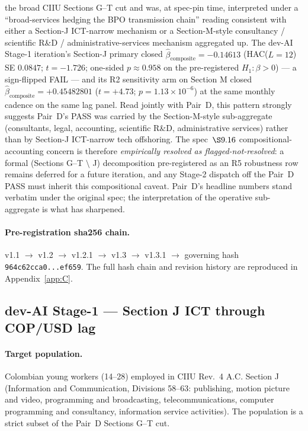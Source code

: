 \begin{enumerate}
    the broad CIIU Sections G--T cut and was, at spec-pin time,
    interpreted under a ``broad-services hedging the BPO transmission
    chain'' reading consistent with either a Section-J ICT-narrow
    mechanism or a Section-M-style consultancy / scientific R\&D /
    administrative-services mechanism aggregated up. The dev-AI
    Stage-1 iteration's Section-J primary closed
    \(\hat{\beta}_{\mathrm{composite}} = -0.14613\)
    (HAC(\(L=12\)) SE \(0.0847\); \(t = -1.726\); one-sided
    \(p \approx 0.958\) on the pre-registered \(H_1: \beta > 0\)) ---
    a sign-flipped FAIL --- and its R2 sensitivity arm on Section M
    closed \(\hat{\beta}_{\mathrm{composite}} = +0.45482801\)
    (\(t = +4.73\); \(p = 1.13 \times 10^{-6}\)) at the same monthly
    cadence on the same lag panel. Read jointly with Pair~D, this
    pattern strongly suggests Pair~D's PASS was carried by the
    Section-M-style sub-aggregate (consultants, legal, accounting,
    scientific R\&D, administrative services) rather than by Section-J
    ICT-narrow tech offshoring. The spec~\(\S 9.16\) compositional-
    accounting concern is therefore \emph{empirically resolved as
    flagged-not-resolved}: a formal (Sections G--T \(\setminus\) J)
    decomposition pre-registered as an R5 robustness row remains
    deferred for a future iteration, and any Stage-2 dispatch off the
    Pair~D PASS must inherit this compositional caveat. Pair~D's
    headline numbers stand verbatim under the original spec; the
    interpretation of the operative sub-aggregate is what has
    sharpened.
\end{enumerate}

\paragraph{Pre-registration sha256 chain.}
v1.1 \(\to\) v1.2 \(\to\) v1.2.1 \(\to\) v1.3 \(\to\) v1.3.1
\(\to\) governing hash
\texttt{964c62cca0...ef659}. The full hash chain and revision history
are reproduced in Appendix~\ref{app:C}.

\subsection{dev-AI Stage-1 --- Section J ICT through COP/USD lag}\label{sec:6.2}

\paragraph{Target population.} Colombian young workers (14--28) employed
in CIIU Rev.~4 A.C. Section J (Information and Communication, Divisions
58--63: publishing, motion picture and video, programming and
broadcasting, telecommunications, computer programming and consultancy,
information service activities). The population is a strict subset of
the Pair~D Sections G--T cut.

